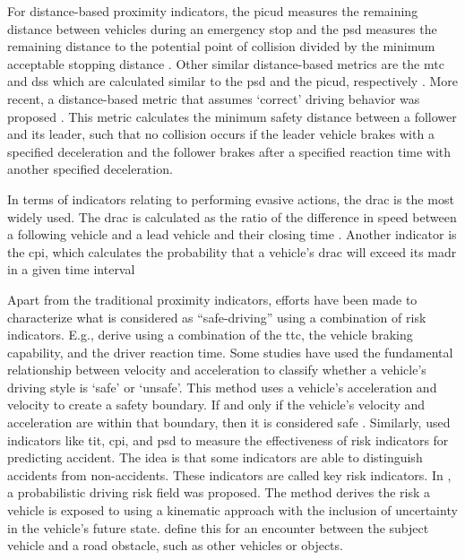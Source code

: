 For distance-based proximity indicators, the \ac{picud} measures the remaining distance between vehicles during an emergency stop \autocite{iida2001traffic, uno2003objective} and the \ac{psd} measures the remaining distance to the potential point of collision divided by the minimum acceptable stopping distance \autocite{allen1978analysis, guido2011comparing, mahmud2017application}. 
Other similar distance-based metrics are the \ac{mtc} and \ac{dss} which are calculated similar to the \ac{psd} and the \ac{picud}, respectively \autocite{kitajima2009estimation, okamura2011impact}. 
More recent, a distance-based metric that assumes `correct' driving behavior was proposed \autocite{shalev2017formal}. 
This metric calculates the minimum safety distance between a follower and its leader, such that no collision occurs if the leader vehicle brakes with a specified deceleration and the follower brakes after a specified reaction time with another specified deceleration. 

In terms of indicators relating to performing evasive actions, the \ac{drac} is the most widely used. 
The \ac{drac} is calculated as the ratio of the difference in speed between a following vehicle and a lead vehicle and their closing time \autocite{almqvist1991use, mahmud2017application}. 
Another indicator is the \ac{cpi}, which calculates the probability that a vehicle's \ac{drac} will exceed its \ac{madr} in a given time interval \autocite{cunto2009simulated} 


Apart from the traditional proximity indicators, efforts have been made to characterize what is considered as ``safe-driving'' using a combination of risk indicators.
E.g., \textcite{wang2014evaluation} derive  using a combination of the \ac{ttc}, the vehicle braking capability, and the driver reaction time.
Some studies have used the fundamental relationship between velocity and acceleration to classify whether a vehicle’s driving style  is `safe' or `unsafe'. 
This method uses a vehicle's acceleration and velocity to create a safety boundary.
If and only if the vehicle's velocity and acceleration are within that boundary, then it is considered safe  \autocite{eboli2016combining}.
Similarly, \textcite{shi2018key} used indicators like \ac{tit}, \ac{cpi}, and \ac{psd} to measure the effectiveness of risk indicators for predicting accident. 
The idea is that some indicators are able to distinguish accidents from non-accidents. 
These indicators are called key risk indicators. 
In \autocite{mullakkal2020probabilistic}, a probabilistic driving risk field was proposed.
The method derives the risk a vehicle is exposed to using a kinematic approach with the inclusion of uncertainty in the vehicle's future state. 
\textcite{mullakkal2020probabilistic} define this for an encounter between the subject vehicle and a road obstacle, such as other vehicles or objects. 
